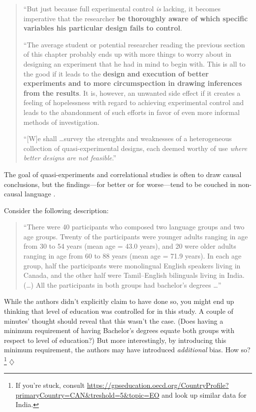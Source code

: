 \documentclass[a4paper]{tufte-book}\usepackage[]{graphicx}\usepackage[]{xcolor}
\newcommand*{\parend}[1][$\diamondsuit$]{%
\leavevmode\unskip\penalty9999 \hbox{}\nobreak\hfill
    \quad\hbox{#1}%
}
\begin{document}
 \begin{quote}
``But just because full experimental control \emph{is} lacking, it becomes imperative that the researcher
\textbf{be thoroughly aware of which specific variables his particular design fails to control}.

``The average student or potential researcher reading the previous section of this chapter probably ends up with more things to worry about in designing an experiment that he had in mind to begin with.
This is all to the good if it leads to the \textbf{design and execution of better experiments and to more
circumspection in drawing inferences from the results}.
It is, however, an unwanted side effect if it creates a feeling of hopelessness with regard to achieving
experimental control and leads to the abandonment of such efforts in favor
of even more informal methods of investigation.

``[W]e shall \dots survey the strenghts and weaknesses of a heterogeneous collection of quasi-experimental designs, each deemed worthy of use \emph{where better designs are not feasible}.'' \citep[p.~34; their emphasis in italics, mine in bold-face]{Campbell1963}
\end{quote}

\medskip

The goal of quasi-experiments and correlational studies
is often to draw causal conclusions, but the findings---for better
or for worse---tend to be couched in non-causal language \citep{Grosz2020}.

Consider the following description:

\medskip

\begin{quote}
``There were 40 participants who composed two language groups and two age groups.
Twenty of the participants were younger adults ranging in age from 30 to 54
years (mean age = 43.0 years), and 20 were older adults ranging in age from
60 to 88 years (mean age = 71.9 years). In each age group, half the participants
were monolingual English speakers living in Canada, and the other half were
Tamil--English bilinguals living in India. (\dots) All the participants in
both groups had bachelor's degrees \dots'' \citep[p.~44]{Bialystok2004}
\end{quote}

\medskip

While the authors didn't explicitly claim to have done so,
you might end up thinking that level of education was controlled
for in this study. A couple of minutes' thought should reveal
that this wasn't the case. (Does having a minimum requirement
of having Bachelor's degrees equate both groups with respect
to level of education?) But more interestingly, by introducing
this minimum requirement, the authors may have introduced
\emph{additional} bias.
How so?\footnote{If you're stuck, consult \url{https://gpseducation.oecd.org/CountryProfile?primaryCountry=CAN&treshold=5&topic=EO} and look up similar data for India.}\parend
\end{document}
